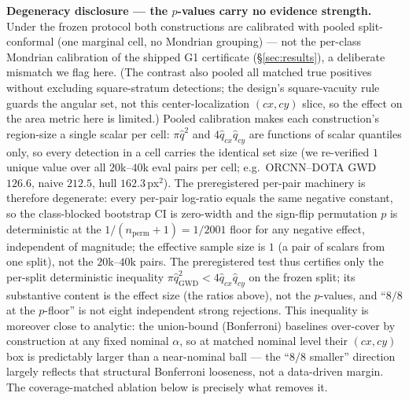 \documentclass[11pt]{article}
\begin{document}
\textbf{Degeneracy disclosure --- the $p$-values carry no evidence strength.} Under the frozen protocol
both constructions are calibrated with pooled split-conformal (one marginal cell, no Mondrian
grouping) --- not the per-class Mondrian calibration of the shipped G1
certificate (\S\ref{sec:results}), a deliberate mismatch we flag here. (The contrast also pooled all
matched true positives without excluding square-stratum detections; the design's square-vacuity rule
guards the angular set, not this center-localization $(cx,cy)$ slice, so the effect on the
area metric here is limited.) Pooled calibration makes each
construction's region-size a single scalar per cell: $\pi\hat q^2$ and $4\hat q_{cx}\hat q_{cy}$
are functions of scalar quantiles only, so every detection in a cell carries the identical set
size (we re-verified $1$ unique value over all $20$k--$40$k eval pairs per cell; e.g.\ ORCNN--DOTA GWD
$126.6$, naive $212.5$, hull $162.3$\,px$^2$). The preregistered per-pair machinery is therefore
degenerate: every per-pair log-ratio equals the same negative constant, so the class-blocked
bootstrap CI is zero-width and the sign-flip permutation $p$ is deterministic at the
$1/(n_{\mathrm{perm}}{+}1)=1/2001$ floor for any negative effect, independent of magnitude; the
effective sample size is $1$ (a pair of scalars from one split), not the $20$k--$40$k pairs.
The preregistered test thus certifies only the per-split deterministic inequality
$\pi\hat q_{\mathrm{GWD}}^2 < 4\hat q_{cx}\hat q_{cy}$ on the frozen split; its substantive content is
the effect size (the ratios above), not the $p$-values, and ``$8/8$ at the $p$-floor'' is
not eight independent strong rejections. This inequality is moreover close to analytic: the
union-bound (Bonferroni) baselines over-cover by construction at any fixed nominal $\alpha$, so at matched
nominal level their $(cx,cy)$ box is predictably larger than a near-nominal ball --- the ``$8/8$ smaller''
direction largely reflects that structural Bonferroni looseness, not a data-driven margin. The
coverage-matched ablation below is precisely what removes it.
\end{document}
